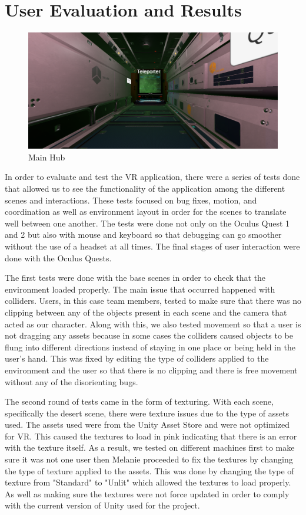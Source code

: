 \documentclass{vgtc}                          %
\begin{document}
\section{User Evaluation and Results}
\begin{figure}[ht!]
  \centering
  \includegraphics[width= \linewidth]{Figures/HubLoad.png}
  \caption{Main Hub}
  \label{fig:hubload}
\end{figure}

In order to evaluate and test the VR application, there were a series of tests done that allowed us to see the functionality of the application among the different scenes and interactions. These tests focused on bug fixes, motion, and coordination as well as environment
layout in order for the scenes to translate well between one another. The tests were done not only on the Oculus Quest 1 and 2 but also with mouse and keyboard so that debugging can go smoother without the use of a headset at all times. The final stages of user interaction
were done with the Oculus Quests.

The first tests were done with the base scenes in order to check that the environment loaded properly. The main issue that occurred happened with colliders. Users, in this case team members, tested to make sure that there was no clipping between any of the objects present in each scene and the camera that
acted as our character. Along with this, we also tested movement so that a user is not dragging any assets because in some cases the colliders caused objects to be flung into different directions instead of staying in one place or being held in the user's hand. This was fixed by editing the type of colliders
applied to the environment and the user so that there is no clipping and there is free movement without any of the disorienting bugs.

The second round of tests came in the form of texturing. With each scene, specifically the desert scene, there were texture issues due to the type of assets used. The assets used were from the Unity Asset Store and were not optimized for VR. This caused the textures to load in pink indicating that there is an error
with the texture itself. As a result, we tested on different machines first to make sure it was not one user then Melanie proceeded to fix the textures by changing the type of texture applied to the assets. This was done by changing the type of texture from "Standard" to "Unlit" which allowed the textures to load properly. As well as making
sure the textures were not force updated in order to comply with the current version of Unity used for the project.
\end{document}
